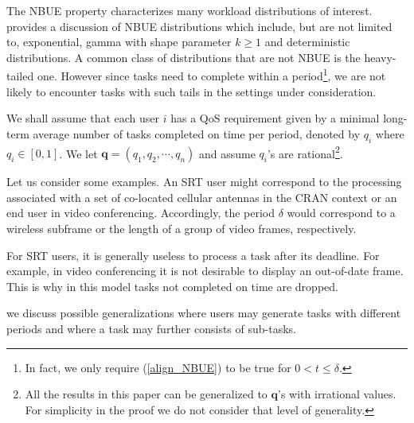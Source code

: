 \documentclass[prodmode,acmtompecs]{acmsmall}
\newcommand{\reqvec}{\mathbf{q}}
\newcommand{\reqscalar}{q}
\newcommand{\myComments}[1]{}
\newif\ifinfocom
\newif\iftompecs
\newif\ifdissertation
\newcommand{\infocomStart}{\ifinfocom \myComments{Infocom: }}
\newcommand{\tompecsStart}{\iftompecs \myComments{TOMPECS version: }}
\newcommand{\dissertationStart}{\ifdissertation  \myComments{Dissertation version: }}
\newcommand{\commentEnd}{\myComments{End}}
\begin{document}
The NBUE property characterizes many workload distributions of interest. \cite{MuS02b} provides a discussion of NBUE distributions which include, but are not limited to, exponential, gamma with shape parameter $k \geq 1$ and deterministic distributions. 
A common class of distributions that are not NBUE is the heavy-tailed one. However since tasks need to complete within a period\footnote{In fact, we only require (\ref{align_NBUE}) to be true for $0 < t \leq \delta$. }, we are not likely to encounter tasks with such tails in the settings under consideration.  

\dissertationStart
The NBUE property characterizes many workload distributions of interest. By \cite{MuS02b} NBUE distributions include but are not limited to exponential distribution, gamma distribution with $k \geq 1$ and deterministic distribution (constant). 
Moreover, many distributions which are not NBUE can be closely approximated by NBUE distributions. For example, the normal distribution can be approximated by gamma distribution with large $k$. 
A common class of distributions that are not NBUE is the heavy-tailed one. However since in this setting tasks must complete within $\delta$, we only require (\ref{align_NBUE}) for $0 < t \leq \delta$ and thus are not likely to care about such tails in practice.  
\commentEnd\fi

We shall assume that each user $i$ has a QoS requirement given by a minimal long-term average number of tasks completed on time per period, denoted by $\reqscalar_i$ where $\reqscalar_i \in [0, 1]$. 
We let $\reqvec = (\reqscalar_1, \reqscalar_2, \cdots, \reqscalar_n)$ and 
assume $\reqscalar_i$'s are rational\footnote{All the results in this paper can be generalized to $\reqvec$'s with irrational values. For simplicity in the proof we do not consider that level of generality. }.

Let us consider some examples. An SRT user might correspond to the processing associated with a set of co-located cellular antennas in the CRAN context or an end user in video conferencing. 
Accordingly, the period $\delta$ would correspond to a wireless subframe or the length of a group of video frames, respectively. 
\dissertationStart
In CRAN each antenna generates a task associated with each subframe. Depending on the traffic and wireless channels, the tasks may take different CPU time and resources to process. 
\commentEnd\fi
For SRT users, it is generally useless to process a task after its deadline. For example, in video conferencing it is not desirable to display an out-of-date frame. This is why in this model tasks not completed on time are dropped. 
\infocomStart
In the extended version of this paper \cite{EXT}, 
\commentEnd\fi
\tompecsStart
In Section \ref{section_possible_generalizations}, 
\commentEnd\fi
we discuss possible generalizations where users may generate tasks with different periods and where a task may further consists of sub-tasks. 
\end{document}
